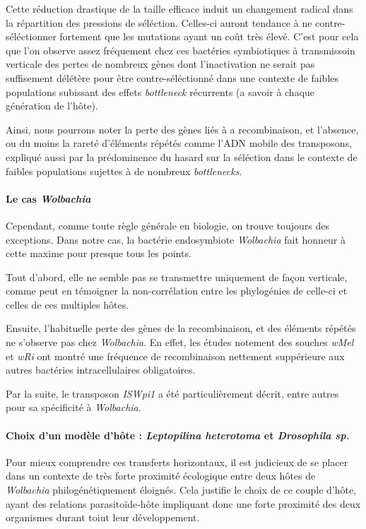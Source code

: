Cette réduction drastique de la taille efficace induit un changement radical dans la répartition des pressions de séléction. Celles-ci auront tendance à ne contre-séléctionner fortement que les mutations ayant un coût très élevé.
C'est pour cela que l'on observe assez fréquement chez ces bactéries symbiotiques à transmissoin verticale des pertes de nombreux gènes\cite{wernegreen2002} dont  l'inactivation ne serait pas suffisement délétère pour être contre-séléctionné dans une contexte de faibles populations subissant des effets \textit{bottleneck} récurrents (a savoir à chaque génération de l'hôte).


Ainsi, nous pourrons noter la perte des gènes liés à a recombinaison, et l'absence, ou du moins la rareté d'éléments répétés comme l'ADN mobile des transposons, expliqué aussi par la prédominence du hasard sur la séléction dans le contexte de faibles populations sujettes à de nombreux \textit{bottlenecks}.

\paragraph{Le cas \textit{Wolbachia}\\}
Cependant, comme toute règle générale en biologie, on trouve toujours des exceptions. Dans notre cas, la bactérie endosymbiote \textit{Wolbachia} fait honneur à cette maxime pour presque tous les points. 

Tout d'abord, elle ne semble pas se transmettre uniquement de façon verticale, comme peut en témoigner la non-corrélation entre les phylogénies de celle-ci et celles de ces multiples hôtes\cite{vavre1999}.

Ensuite, l’habituelle perte des gènes de la recombinaison, et des éléments répétés ne s’observe pas chez \textit{Wolbachia}. En effet, les études notement des souches \textit{wMel} et \textit{wRi} ont montré une fréquence de recombinaison nettement suppérieure aux autres bactéries intracellulaires obligatoires.

Par la suite, le transposon \textit{ISWpi1} a été particulièrement décrit\cite{Cordaux2008}, entre autres pour sa spécificité à \textit{Wolbachia}.%

\paragraph{Choix d’un modèle d’hôte : \textit{Leptopilina heterotoma} et \textit{Drosophila sp.}\\}
Pour mieux comprendre ces transferts horizontaux, il est judicieux de se placer dans un contexte de très forte proximité écologique entre deux hôtes de \textit{Wolbachia} philogénétiquement éloignés. Cela justifie le choix de ce couple d’hôte, ayant des relations parasitoïde‐hôte impliquant donc une forte proximité des deux organismes durant toiut leur développement.

